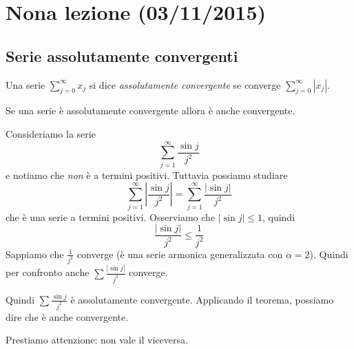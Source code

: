 \chapter{Nona lezione (03/11/2015)}

\section{Serie assolutamente convergenti}
\begin{definition}
Una serie $\sum_{j=0}^\infty x_j$ si dice \emph{assolutamente convergente} se converge $\sum_{j=0}^\infty |x_j|$.
\end{definition}

\begin{theorem}
Se una serie è assolutamente convergente allora è anche convergente.
\end{theorem}

\begin{example}
Consideriamo la serie
\begin{equation*}
\sum_{j=1}^\infty \frac{\sin j}{j^2}
\end{equation*}
e notiamo che \emph{non} è a termini positivi. Tuttavia possiamo studiare 
\begin{equation*}
\sum_{j=1}^\infty \left\lvert \frac{\sin j}{j^2} \right\rvert = \sum_{j=1}^\infty \frac{|\sin j|}{j^2}
\end{equation*}
che è una serie a termini positivi. Osserviamo che $|\sin j| \le 1$, quindi
\begin{equation*}
\frac{|\sin j|}{j^2} \le \frac{1}{j^2}
\end{equation*}
Sappiamo che $\frac{1}{j^2}$ converge (è una serie armonica generalizzata con $\alpha = 2$). Quindi per confronto anche $\sum \frac{|\sin j|}{j^2}$ converge.

Quindi $\sum \frac{\sin j}{j^2}$ è assolutamente convergente. Applicando il teorema, possiamo dire che è anche convergente.
\end{example}

Prestiamo attenzione: non vale il viceversa.

